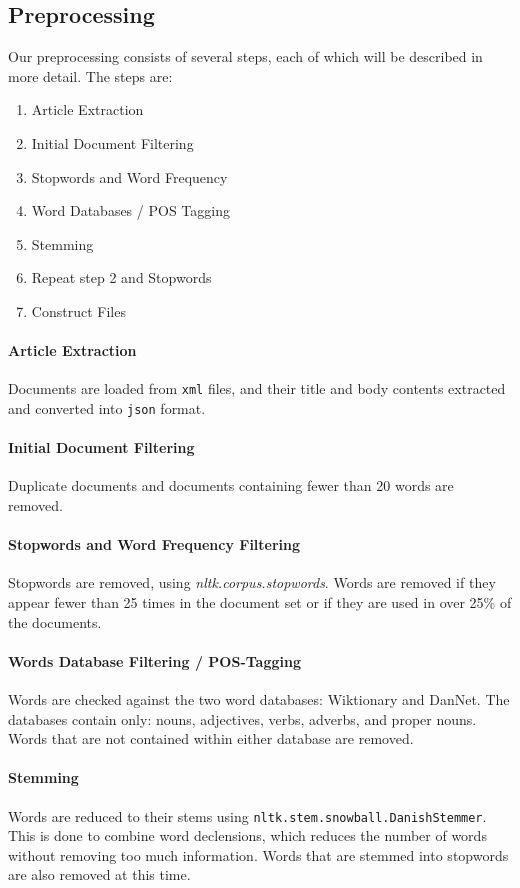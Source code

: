 \subsection{Preprocessing}\label{subsec:prepro}

Our preprocessing consists of several steps, each of which will be described in more detail.
The steps are:
\begin{enumerate}
	\item Article Extraction
	\item Initial Document Filtering
	\item Stopwords and Word Frequency
	\item Word Databases / POS Tagging
	\item Stemming
	\item Repeat step 2 and Stopwords
	\item Construct Files
\end{enumerate}

\paragraph{Article Extraction}
Documents are loaded from \texttt{xml} files, and their title and body contents extracted and converted into \texttt{json} format.

\paragraph{Initial Document Filtering}
Duplicate documents and documents containing fewer than 20 words are removed.

\paragraph{Stopwords and Word Frequency Filtering}
Stopwords are removed, using \emph{nltk.corpus.stopwords}. 
Words are removed if they appear fewer than 25 times in the document set or if they are used in over 25\% of the documents.

\paragraph{Words Database Filtering / POS-Tagging}
Words are checked against the two word databases: Wiktionary and DanNet. 
The databases contain only: nouns, adjectives, verbs, adverbs, and proper nouns. 
Words that are not contained within either database are removed.

\paragraph{Stemming}
Words are reduced to their stems using \texttt{nltk.stem.snowball.DanishStemmer}. 
This is done to combine word declensions, which reduces the number of words without removing too much information.
Words that are stemmed into stopwords are also removed at this time.

